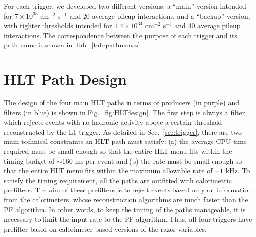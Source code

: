 For each trigger, we developed two different versions: a ``main''
version intended for $7\times 10^{33}$ cm$^{-2}$ s$^{-1}$ and 20 average
pileup interactions, and a ``backup'' version, with tighter thresholds
intended for $1.4\times 10^{34}$ cm$^{-2}$ s$^{-1}$ and 40 average
pileup interactions. The correspondence between the purpose of each
trigger and its path name is shown in Tab.~\ref{tab:pathnames}.

\begin{table}[ht!]
\centering
 \caption{Correspondence between the purpose of each
trigger and its path name.\label{tab:pathnames}}
\end{table}

\section{HLT Path Design}

The design of the four main HLT paths in terms of producers (in
purple) and filters (in blue) is shown
in Fig.~\ref{fig:HLTdesign}. The first step is always a filter, which
rejects events with no hadronic activity above a certain threshold reconstructed by the L1 trigger.
As detailed in Sec.~\ref{sec:trigger}, there are two main technical
constraints an HLT path must satisfy: (a) the average CPU time required must be
small enough so that the entire HLT menu fits within the timing budget
 of $\sim160$ \unit{ms} per event and (b) the rate must
be small enough so that the entire HLT menu fits within the maximum
allowable rate  of $\sim1$ \unit{kHz}. To satisfy the timing
requirement, all the paths are outfitted with
calorimetric prefilters. The aim of these prefilters is to reject
events based only on information from the calorimeters, whose
reconstruction algorithms are much faster than the PF algorithm. In
other words, to keep the timing of the paths manageable, it is
necessary to limit the input rate to the PF algorithm. Thus, all four
triggers have prefilter based on calorimeter-based versions of the razor
variables.

